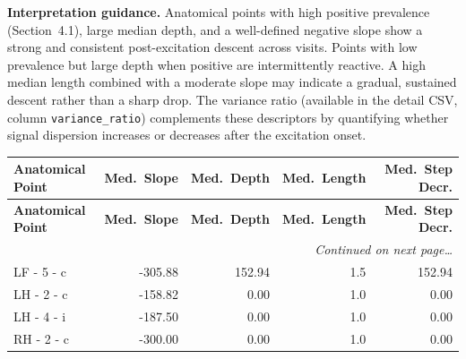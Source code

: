 \documentclass[a4paper,11pt]{article}
\begin{document}
\medskip
\noindent\textbf{Interpretation guidance.}
Anatomical points with high positive prevalence (Section~4.1), large median depth, and a
well-defined negative slope show a strong and consistent post-excitation descent across
visits.
Points with low prevalence but large depth when positive are intermittently reactive.
A high median length combined with a moderate slope may indicate a gradual, sustained
descent rather than a sharp drop.
The variance ratio (available in the detail CSV, column \texttt{variance\_ratio}) complements
these descriptors by quantifying whether signal dispersion increases or decreases after the
excitation onset.

\begin{small}
\begin{longtable}{p{4.5cm}rrrr}
\toprule
\textbf{Anatomical Point} &
\textbf{Med.\ Slope} &
\textbf{Med.\ Depth} &
\textbf{Med.\ Length} &
\textbf{Med.\ Step Decr.} \\
\midrule
\endfirsthead
\toprule
\textbf{Anatomical Point} &
\textbf{Med.\ Slope} &
\textbf{Med.\ Depth} &
\textbf{Med.\ Length} &
\textbf{Med.\ Step Decr.} \\
\midrule
\endhead
\midrule
\multicolumn{5}{r}{\small\emph{Continued on next page\ldots}} \\
\endfoot
\bottomrule
\endlastfoot
LF - 5 - c & -305.88 & 152.94 & 1.5 & 152.94 \\
LH - 2 - c & -158.82 & 0.00 & 1.0 & 0.00 \\
LH - 4 - i & -187.50 & 0.00 & 1.0 & 0.00 \\
RH - 2 - c & -300.00 & 0.00 & 1.0 & 0.00 \\
\end{longtable}
\end{small}
\end{document}
